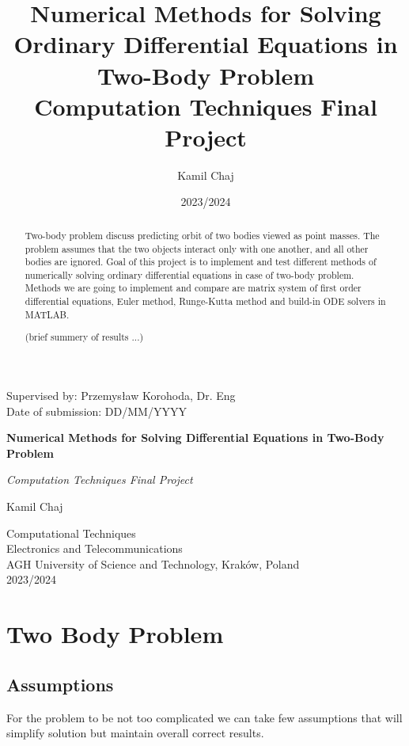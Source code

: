 \documentclass[english,12pt,a4paper]{report}
\title{Numerical Methods for Solving Ordinary Differential Equations in Two-Body Problem\\
	\normalsize Computation Techniques Final Project}
\author{Kamil Chaj}
\date{2023/2024}
\begin{document}
	\begin{titlepage}
		\noindent
		Supervised by: Przemysław Korohoda, Dr. Eng \\
		Date of submission: DD/MM/YYYY
		\begin{center}

			\vspace*{-1cm}

			\vfill
			
			\textbf{Numerical Methods for Solving Differential Equations in Two-Body Problem}
						
			\vspace{0.5cm}
			
			\textit{Computation Techniques Final Project}
			
			\vspace{1.5cm}
			
			Kamil Chaj
			
			\vspace{1.5cm}
			
			
			\vfill
									
			Computational Techniques \\
			Electronics and Telecommunications \\
			AGH University of Science and Technology, Kraków, Poland\\
			2023/2024
			
		\end{center}
	\end{titlepage}
	\begin{abstract}
		Two-body problem discuss predicting orbit of two bodies viewed as point masses. The problem assumes that the two objects interact only with one another, and all other bodies are ignored. Goal of this project is to implement and test different methods of numerically solving ordinary differential equations in case of two-body problem. Methods we are going to implement and compare are matrix system of first order differential equations, Euler method, Runge-Kutta method and build-in ODE solvers in MATLAB. 
		
		(brief summery of results ...)
	\end{abstract}
		\tableofcontents
	\chapter{Two Body Problem}
	\section{Assumptions}
	For the problem to be not too complicated we can take few assumptions that will simplify solution but maintain overall correct results.
	
\end{document}
